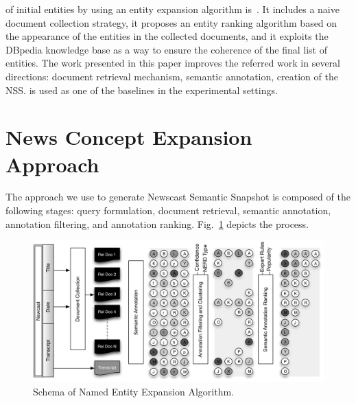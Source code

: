 \documentclass{llncs}
\newcommand{\hg}[1]{\colorbox{yellow}{#1}}
\begin{document}
of initial entities by using an entity expansion algorithm is~\cite{RedondoGarcia2014}. It includes a naive document collection strategy, it proposes an entity ranking algorithm based on the appearance of the entities in the collected documents, and it exploits the DBpedia knowledge base as a way to ensure the coherence of the final list of entities. The work presented in this paper improves the referred work in several directions: document retrieval mechanism, semantic annotation, creation of the NSS. \cite{RedondoGarcia2014} is used as one of the baselines in the experimental settings.%

\section{News Concept Expansion Approach}
\label{sec:Approach}
The approach we use to generate Newscast Semantic Snapshot is composed of the following stages: query formulation, document retrieval, semantic annotation, annotation filtering, and annotation ranking. Fig.~\ref{fig:namedEntityExpansion} depicts the process.
\begin{figure}[h!]
\centering
\includegraphics[width=1\textwidth]{figure/ExpansionDiagram}
\caption{Schema of Named Entity Expansion Algorithm.}
\label{fig:namedEntityExpansion}%
\end{figure}
\end{document}
